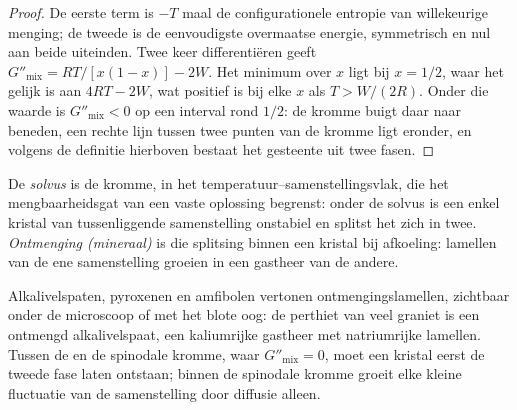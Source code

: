 \begin{proof}
De eerste term is $-T$ maal de configurationele entropie van willekeurige menging;
de tweede is de eenvoudigste overmaatse energie, symmetrisch en nul aan beide uiteinden.
Twee keer differentiëren geeft $G''_{\text{mix}} = RT/[x(1 - x)] - 2W$. Het minimum
over $x$ ligt bij $x = 1/2$, waar het gelijk is aan $4RT - 2W$, wat positief is bij
elke $x$ als $T > W/(2R)$. Onder die waarde is $G''_{\text{mix}} < 0$ op een interval
rond $1/2$: de kromme buigt daar naar beneden, een rechte lijn tussen twee punten
van de kromme ligt eronder, en volgens de definitie hierboven bestaat het gesteente uit
twee fasen.
\end{proof}

\begin{definition}\label{def:b3:petrological-thermodynamics:solvus}
De \emph{solvus} is de kromme, in het temperatuur--samenstellingsvlak,
die het mengbaarheidsgat van een vaste oplossing begrenst: onder de solvus is een
enkel kristal van tussenliggende samenstelling onstabiel en splitst het zich in twee.
\emph{Ontmenging (mineraal)} is die splitsing
binnen een kristal bij afkoeling: lamellen van de ene samenstelling groeien in een gastheer van de
andere.
\end{definition}

Alkalivelspaten, pyroxenen en amfibolen vertonen ontmengingslamellen,
zichtbaar onder de microscoop of met het blote oog: de perthiet van veel graniet is
een ontmengd alkalivelspaat, een kaliumrijke gastheer met natriumrijke
lamellen. Tussen de  en de spinodale kromme, waar $G''_{\text{mix}} = 0$,
moet een kristal eerst de tweede fase laten ontstaan; binnen de spinodale kromme groeit elke kleine
fluctuatie van de samenstelling door diffusie alleen.

